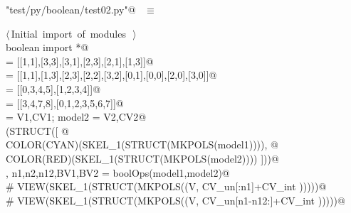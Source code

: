 \documentclass[11pt,oneside]{article}	%
\begin{document}
\begin{flushleft} \small
\begin{minipage}{\linewidth} \label{scrap9}
\verb@"test/py/boolean/test02.py"@\nobreak\ {\footnotesize {} }$\equiv$
\vspace{-1ex}
\begin{list}{}{} \item
\mbox{}\verb@@\hbox{$\langle\,$Initial import of modules\nobreak\ {\footnotesize {}}$\,\rangle$}\verb@@\\
\mbox{}\verb@from boolean import *@\\
\mbox{} = [[1,1],[3,3],[3,1],[2,3],[2,1],[1,3]]@\\
\mbox{} = [[1,1],[1,3],[2,3],[2,2],[3,2],[0,1],[0,0],[2,0],[3,0]]@\\
\mbox{} = [[0,3,4,5],[1,2,3,4]]@\\
\mbox{} = [[3,4,7,8],[0,1,2,3,5,6,7]]@\\
\mbox{} = V1,CV1; model2 = V2,CV2@\\
\mbox{}\verb@VIEW(STRUCT([ @\\
\mbox{}\verb@   COLOR(CYAN)(SKEL_1(STRUCT(MKPOLS(model1)))), @\\
\mbox{}\verb@   COLOR(RED)(SKEL_1(STRUCT(MKPOLS(model2)))) ]))@\\
\mbox{}\verb@V, n1,n2,n12,BV1,BV2 = boolOps(model1,model2)@\\
\mbox{}\verb@# VIEW(SKEL_1(STRUCT(MKPOLS((V, CV_un[:n1]+CV_int )))))@\\
\mbox{}\verb@# VIEW(SKEL_1(STRUCT(MKPOLS((V, CV_un[n1-n12:]+CV_int )))))@\\
\mbox{}\verb@@{\NWsep}
\end{list}
\vspace{-2ex}
\end{minipage}\\[4ex]
\end{flushleft}
\end{document}
